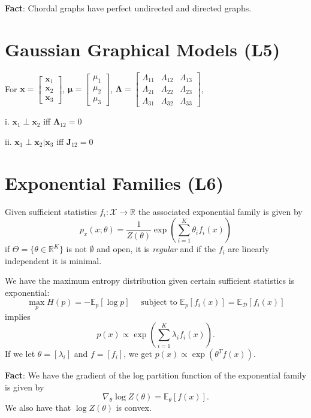 \documentclass[9pt]{article}
\begin{document}
\begin{multicols}{2}
\textbf{Fact}: Chordal graphs have perfect undirected and directed
graphs.

\section{Gaussian Graphical Models (L5)}
For $\mathbf{x}= \begin{bmatrix} \mathbf{x}_1 \\  \mathbf{x}_2 \\
\mathbf{x}_3 \end{bmatrix}$, $\mathbf{\mu} = \begin{bmatrix} 
\mu_1 \\ \mu_2 \\ \mu_3 \end{bmatrix}$, $\mathbf{\Lambda} = 
\begin{bmatrix} \Lambda_{11} & \Lambda_{12} & \Lambda_{13} \\
\Lambda_{21} & \Lambda_{22} & \Lambda_{23} \\ 
\Lambda_{31} & \Lambda_{32} & \Lambda_{33} \end{bmatrix}$, 

i. $\mathbf{x}_1 \perp \mathbf{x}_2$ iff $\mathbf{\Lambda}_{12}=0$

ii. $\mathbf{x}_1 \perp \mathbf{x}_2 | \mathbf{x}_3$ iff $\mathbf{J}_
{12}=0$

\section{Exponential Families (L6)}

Given sufficient statistics $f_i: \mathcal{X} \to \mathbb{R}$ the 
associated exponential family is given by $$p_{x}(x;\theta) = 
\frac{1}{Z(\theta)}\exp\left(\sum_{i=1}^{K}\theta_i f_i(x)\right)$$ 
if $\Theta = \{\theta \in \mathbb{R}^K\}$ is not $\emptyset$ and 
open, it is \textit{regular} and if the $f_i$ are linearly 
independent it is minimal.

We have the maximum entropy distribution given certain sufficient
statistics is exponential: 
$$\max_{p}H(p)=-\mathbb{E}_{p}[\log p] \quad \text{ subject to } \mathbb{E}_{p}[f_i(x)]=\mathbb{E}_\mathcal{D}[f_i(x)]$$ implies $$p(x) \propto
\exp\left(\sum_{i=1}^{K}\lambda_i f_i(x)\right).$$ If we let $\theta=[\lambda_i]$ and $f=[f_i]$, we get $p(x) \propto \exp(\theta^{T}f(x))$. 

\textbf{Fact}: We have the gradient of the log partition function 
of the exponential family is given by $$\nabla_{\theta}\log Z(\theta) = \mathbb{E}_{\theta}[f(x)].$$ We also have that $\log Z(\theta)$ is convex. 


\end{multicols}
\end{document}
